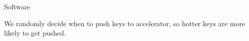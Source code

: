 \begin{block}{Software}

We randomly decide when to push keys to accelerator, so hotter keys are more likely to get pushed.


\end{block}

